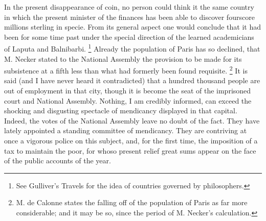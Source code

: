 In the present disappearance of coin, no person could think it the same country in which the present minister of the finances has been able to discover fourscore millions sterling in specie. From its general aspect one would conclude that it had been for some time past under the special direction of the learned academicians of Laputa and Balnibarbi.
\footnote{ See Gulliver's Travels for the idea of countries governed by philosophers.}
 Already the population of Paris has so declined, that M. Necker stated to the National Assembly the provision to be made for its subsistence at a fifth less than what had formerly been found requisite.
\footnote{ M. de Calonne states the falling off of the population of Paris as far more considerable; and it may be so, since the period of M. Necker's calculation.}
 It is said (and I have never heard it contradicted) that a hundred thousand people are out of employment in that city, though it is become the seat of the imprisoned court and National Assembly. Nothing, I am credibly informed, can exceed the shocking and disgusting spectacle of mendicancy displayed in that capital. Indeed, the votes of the National Assembly leave no doubt of the fact. They have lately appointed a standing committee of mendicancy. They are contriving at once a vigorous police on this subject, and, for the first time, the imposition of a tax to maintain the poor, for whoso present relief great sums appear on the face of the public accounts of the year.

